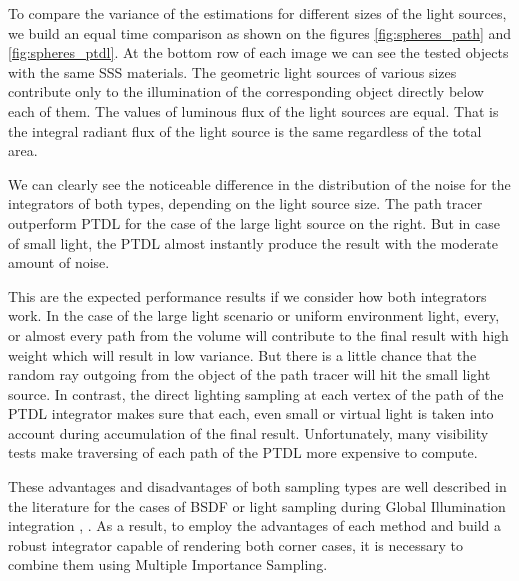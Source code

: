 To compare the variance of the estimations for different sizes of the light sources, we build
an equal time comparison as shown on the figures \ref{fig:spheres_path} and \ref{fig:spheres_ptdl}.
At the bottom row of each image we can see the tested objects with the same SSS materials. The
geometric light sources of various sizes contribute only to the illumination of the corresponding
object directly below each of them. The values of luminous flux of the light sources are equal. That
is the integral radiant flux of the light source is the same regardless of the total area.

We can clearly see the noticeable difference in the distribution of the noise for the integrators of
both types, depending on the light source size. The path tracer outperform PTDL for the case of the
large light source on the right. But in case of small light, the PTDL almost instantly produce the
result with the moderate amount of noise.

This are the expected performance results if we consider how both integrators work. In
the case of the large light scenario or uniform environment light, every, or almost every path from
the volume will contribute to the final result with high weight which will result in low variance.
But there is a little chance that the random ray outgoing from the object of the path tracer will
hit the small light source. In contrast, the direct lighting sampling at each vertex of the path of
the PTDL integrator makes sure that each, even small or virtual light is taken into account during
accumulation of the final result. Unfortunately, many visibility tests make traversing of each path
of the PTDL more expensive to compute.

These advantages and disadvantages of both sampling types are well described in the literature for
the cases of BSDF or light sampling during Global Illumination integration
\cite{Veach:1998:RMC:927297}, \cite{pharr2010physically}.
As a result, to employ the advantages of each method and build a robust integrator capable of rendering
both corner cases, it is necessary to combine them using Multiple Importance Sampling.

